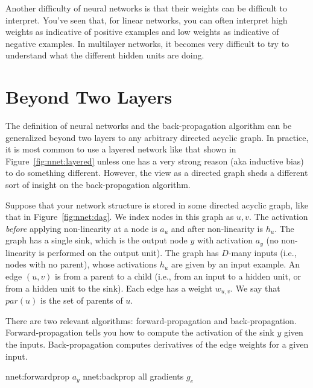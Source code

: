 Another difficulty of neural networks is that their weights can be
difficult to interpret.  You've seen that, for linear networks, you
can often interpret high weights as indicative of positive examples
and low weights as indicative of negative examples.  In multilayer
networks, it becomes very difficult to try to understand what the
different hidden units are doing.



\section{Beyond Two Layers}
\MoveNextFigure{-10cm}

The definition of neural networks and the back-propagation algorithm
can be generalized beyond two layers to any arbitrary directed acyclic
graph.  In practice, it is most common to use a layered network like
that shown in Figure~\ref{fig:nnet:layered} unless one has a very
strong reason (aka inductive bias) to do something different.
However, the view as a directed graph sheds a different sort of
insight on the back-propagation algorithm.

\MoveNextFigure{-1cm}

Suppose that your network structure is stored in some directed acyclic
graph, like that in Figure~\ref{fig:nnet:dag}.  We index nodes in this
graph as $u,v$.  The activation \emph{before} applying non-linearity
at a node is $a_u$ and after non-linearity is $h_u$.  The graph has a
single sink, which is the output node $y$ with activation $a_y$ (no
non-linearity is performed on the output unit).  The graph has
$D$-many inputs (i.e., nodes with no parent), whose activations $h_u$
are given by an input example.  An edge $(u,v)$ is from a parent to a
child (i.e., from an input to a hidden unit, or from a hidden unit to
the sink).  Each edge has a weight $w_{u,v}$.  We say that
$\textit{par}(u)$ is the set of parents of $u$.

There are two relevant algorithms: forward-propagation and
back-propagation.  Forward-propagation tells you how to compute the
activation of the sink $y$ given the inputs.  Back-propagation
computes derivatives of the edge weights for a given input.

\newalgorithm%
  {nnet:forwardprop}%
  {}
  {
\ENDFOR
{}
\ENDFOR
\RETURN $a_y$
}
\newalgorithm%
  {nnet:backprop}%
  {}
  {
\ENDFOR
\ENDFOR
\RETURN all gradients $g_e$
}

